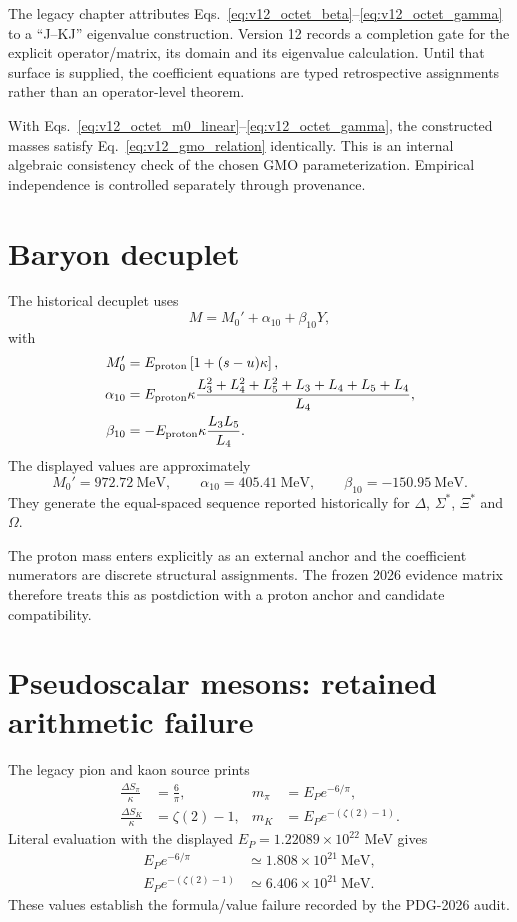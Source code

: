 The legacy chapter attributes Eqs.~\eqref{eq:v12_octet_beta}--\eqref{eq:v12_octet_gamma} to a ``J--KJ'' eigenvalue construction. Version 12 records a completion gate for the explicit operator/matrix, its domain and its eigenvalue calculation. Until that surface is supplied, the coefficient equations are typed retrospective assignments rather than an operator-level theorem.

With Eqs.~\eqref{eq:v12_octet_m0_linear}--\eqref{eq:v12_octet_gamma}, the constructed masses satisfy Eq.~\eqref{eq:v12_gmo_relation} identically. This is an internal algebraic consistency check of the chosen GMO parameterization. Empirical independence is controlled separately through provenance.

\section{Baryon decuplet}

The historical decuplet uses
\begin{equation}
M=M_0'+\alpha_{10}+\beta_{10}Y,
\label{eq:v12_decuplet}
\end{equation}
with
\begin{align}
M_0'&=E_{\rm proton}\left[1+(s-u)\kappa\right],\\
\alpha_{10}
&=E_{\rm proton}\kappa
\frac{L_3^2+L_4^2+L_5^2+L_3+L_4+L_5+L_4}{L_4},\\
\beta_{10}
&=-E_{\rm proton}\kappa\frac{L_3L_5}{L_4}.
\end{align}
The displayed values are approximately
\[
M_0'=972.72\ \mathrm{MeV},\qquad
\alpha_{10}=405.41\ \mathrm{MeV},\qquad
\beta_{10}=-150.95\ \mathrm{MeV}.
\]
They generate the equal-spaced sequence reported historically for $\Delta$, $\Sigma^*$, $\Xi^*$ and $\Omega$.

The proton mass enters explicitly as an external anchor and the coefficient numerators are discrete structural assignments. The frozen 2026 evidence matrix therefore treats this as postdiction with a proton anchor and candidate compatibility.

\section{Pseudoscalar mesons: retained arithmetic failure}

The legacy pion and kaon source prints
\begin{align}
\frac{\Delta S_\pi}{\kappa}&=\frac6\pi,
& m_\pi&=E_Pe^{-6/\pi},\\
\frac{\Delta S_K}{\kappa}&=\zeta(2)-1,
& m_K&=E_Pe^{-(\zeta(2)-1)}.
\end{align}
Literal evaluation with the displayed $E_P=1.22089\times10^{22}$ MeV gives
\begin{align}
E_Pe^{-6/\pi}&\simeq1.808\times10^{21}\ \mathrm{MeV},\\
E_Pe^{-(\zeta(2)-1)}&\simeq6.406\times10^{21}\ \mathrm{MeV}.
\end{align}
These values establish the formula/value failure recorded by the PDG-2026 audit.

